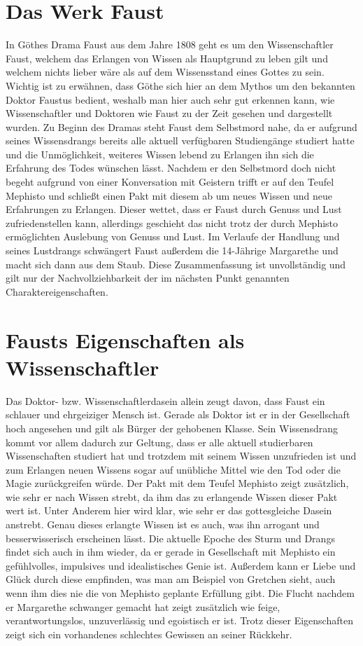 \documentclass[12pt]{scrreprt}
\begin{document}
\section{Das Werk Faust}
	\label{sec:das werk faust}
In Göthes Drama Faust aus dem Jahre 1808 geht es um den Wissenschaftler Faust, welchem das Erlangen von Wissen als Hauptgrund zu leben gilt und welchem nichts lieber wäre als auf dem Wissensstand eines Gottes zu sein.
Wichtig ist zu erwähnen, dass Göthe sich hier an dem Mythos um den bekannten Doktor Faustus bedient, weshalb man hier auch sehr gut erkennen kann, wie Wissenschaftler und Doktoren wie Faust zu der Zeit gesehen und dargestellt wurden.
Zu Beginn des Dramas steht Faust dem Selbstmord nahe, da er aufgrund seines Wissensdrangs bereits alle aktuell verfügbaren Studiengänge studiert hatte und die Unmöglichkeit, weiteres Wissen lebend zu Erlangen ihn sich die Erfahrung des Todes wünschen lässt.
Nachdem er den Selbstmord doch nicht begeht aufgrund von einer Konversation mit Geistern trifft er auf den Teufel Mephisto und schließt einen Pakt mit diesem ab um neues Wissen und neue Erfahrungen zu Erlangen.
Dieser wettet, dass er Faust durch Genuss und Lust zufriedenstellen kann, allerdings geschieht das nicht trotz der durch Mephisto ermöglichten Auslebung von Genuss und Lust.
Im Verlaufe der Handlung und seines Lustdrangs schwängert Faust außerdem die 14-Jährige Margarethe und macht sich dann aus dem Staub.
Diese Zusammenfassung ist unvollständig und gilt nur der Nachvollziehbarkeit der im nächsten Punkt genannten Charaktereigenschaften.
\section{Fausts Eigenschaften als Wissenschaftler}
	\label{sec:fausts Eigenschaften}
Das Doktor- bzw. Wissenschaftlerdasein allein zeugt davon, dass Faust ein schlauer und ehrgeiziger Mensch ist.
Gerade als Doktor ist er in der Gesellschaft hoch angesehen und gilt als Bürger der gehobenen Klasse.
Sein Wissensdrang kommt vor allem dadurch zur Geltung, dass er alle aktuell studierbaren Wissenschaften studiert hat und trotzdem mit seinem Wissen unzufrieden ist und zum Erlangen neuen Wissens sogar auf unübliche Mittel wie den Tod oder die Magie zurückgreifen würde.
Der Pakt mit dem Teufel Mephisto zeigt zusätzlich, wie sehr er nach Wissen strebt, da ihm das zu erlangende Wissen dieser Pakt wert ist.
Unter Anderem hier wird klar, wie sehr er das gottesgleiche Dasein anstrebt.
Genau dieses erlangte Wissen ist es auch, was ihn arrogant und besserwisserisch erscheinen lässt.
Die aktuelle Epoche des Sturm und Drangs findet sich auch in ihm wieder, da er gerade in Gesellschaft mit Mephisto ein gefühlvolles, impulsives und idealistisches Genie ist.
Außerdem kann er Liebe und Glück durch diese empfinden, was man am Beispiel von Gretchen sieht, auch wenn ihm dies nie die von Mephisto geplante Erfüllung gibt.
Die Flucht nachdem er Margarethe schwanger gemacht hat zeigt zusätzlich wie feige, verantwortungslos, unzuverlässig und egoistisch er ist.
Trotz dieser Eigenschaften zeigt sich ein vorhandenes schlechtes Gewissen an seiner Rückkehr.
\autocite{wiki:Faust_Studyflix}
\autocite{wiki:Faust_Studysmarter}
\end{document}
